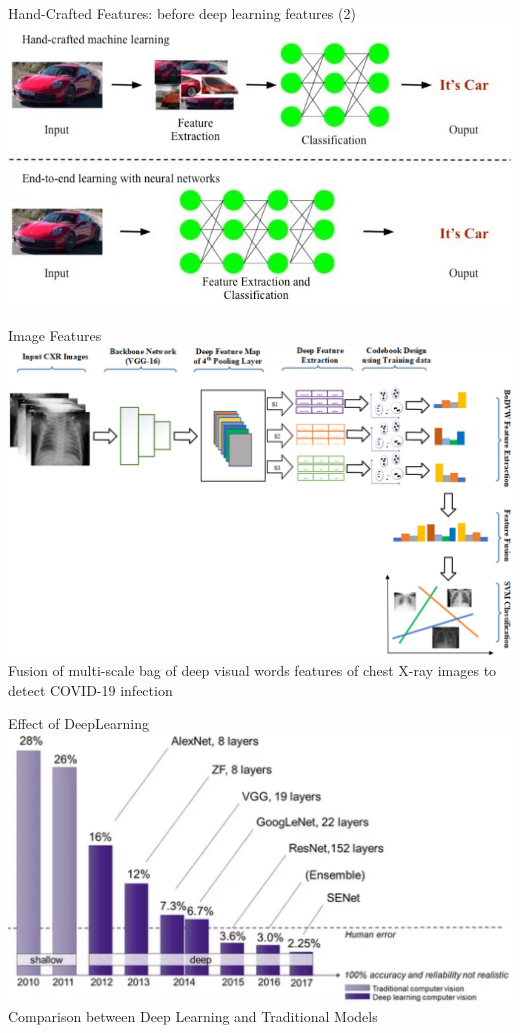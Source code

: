 \documentclass[serif, aspectratio=169]{beamer}
\begin{document}
	\begin{frame}{Hand-Crafted Features: before deep learning features (2)}
		\centering
		\includegraphics[keepaspectratio, scale=0.5]{pic/do-machine-learning-neural-networks-tasks-using-python copy 3.jpg}
	\end{frame}
	\begin{frame}{Image Features}
		\centering
		\includegraphics[keepaspectratio, scale=0.23]{pic/image_features.png}\\ \small{Fusion of multi-scale bag of deep visual words features of chest X-ray images to detect COVID-19 infection}
	\end{frame}
	\begin{frame}{Effect of DeepLearning}
		\centering
		\includegraphics[keepaspectratio, scale=0.35]{pic/Synopsys_computer-vision-processors.png}\\\small{Comparison between Deep Learning and Traditional Models}
	\end{frame}
	
\end{document}
